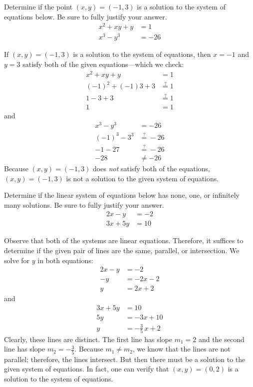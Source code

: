 \documentclass[11pt,letterpaper]{article}
\begin{document}

 Determine if the point $(x, y)= (-1, 3)$ is a solution to the system of equations below. Be sure to fully justify your answer.
	\[
	\begin{aligned}
	x^2 + xy + y&= 1 \\
	x^3 - y^3&= -26
	\end{aligned}
	\] \pspace

\sol If $(x, y)= (-1, 3)$ is a solution to the system of equations, then $x= -1$ and $y= 3$ satisfy both of the given equations---which we check:
	\[
	\begin{aligned}
	x^2 + xy + y&= 1 \\
	(-1)^2 + (-1)3 + 3&\stackrel{?}{=} 1 \\
	1 - 3 + 3&\stackrel{?}{=} 1 \\
	1&= 1
	\end{aligned}
	\] \pspace
and \pspace
	\[
	\begin{aligned}
	x^3 - y^3&= -26 \\
	(-1)^3 - 3^3&\stackrel{?}{=} -26 \\
	-1 - 27&\stackrel{?}{=} -26 \\
	-28&\neq -26
	\end{aligned}
	\]
Because $(x, y)= (-1, 3)$ does \textit{not} satisfy both of the equations, $(x, y)= (-1, 3)$ is not a solution to the given system of equations. 



\newpage



 Determine if the linear system of equations below has none, one, or infinitely many solutions. Be sure to fully justify your answer. 
	\[
	\begin{aligned}
	2x - y&= -2 \\
	3x + 5y&= 10
	\end{aligned}
	\] \pspace

\sol Observe that both of the systems are linear equations. Therefore, it suffices to determine if the given pair of lines are the same, parallel, or intersection. We solve for $y$ in both equations:
	\[
	\begin{aligned}
	2x - y&= -2 \\
	-y&= -2x - 2 \\
	y&= 2x + 2
	\end{aligned}
	\] \pspace
and \pspace
	\[
	\begin{aligned}
	3x + 5y&= 10 \\
	5y&= -3x + 10 \\
	y&= -\frac{3}{5}\,x + 2
	\end{aligned}
	\] 
Clearly, these lines are distinct. The first line has slope $m_1= 2$ and the second line has slope $m_2= -\frac{3}{5}$. Because $m_1 \neq m_2$, we know that the lines are not parallel; therefore, the lines intersect. But then there must be a solution to the given system of equations. In fact, one can verify that $(x, y)= (0, 2)$ is a solution to the system of equations. 
\end{document}
